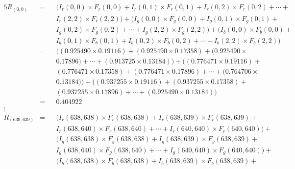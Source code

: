     \begin{alignat*}{5}
        R_{(0, 0)}          &=  &&\bigl( I_{r}(0, 0)\times F_{r}(0, 0) + I_{r}(0, 1)\times F_{r}(0, 1) + I_{r}(0, 2)\times F_{r}(0, 2) + \cdots + \\
                            &   &&I_{r}(2, 2)\times F_{r}(2, 2) \bigr) + \bigl( I_{g}(0, 0)\times F_{g}(0, 0) + I_{g}(0, 1)\times F_{g}(0, 1) + \\
                            &   &&I_{g}(0, 2)\times F_{g}(0, 2) + \cdots + I_{g}(2, 2)\times F_{g}(2, 2) \bigr) + \bigl( I_{b}(0, 0)\times F_{b}(0, 0) + \\
                            &   &&I_{b}(0, 1)\times F_{b}(0, 1) + I_{b}(0, 2)\times F_{b}(0, 2) + \cdots + I_{b}(2, 2)\times F_{b}(2, 2) \bigr) \\
                            &=  &&\bigl( (0.925490\times 0.19116) + (0.925490\times 0.17358) + (0.925490\times \\
                            &   &&0.17896) + \cdots + (0.913725\times 0.13184) \bigr) + \bigl( (0.776471\times 0.19116) + \\
                            &   &&(0.776471\times 0.17358) + (0.776471\times 0.17896) + \cdots + (0.764706\times \\
                            &   &&0.13184) \bigr) + \bigl( (0.937255\times 0.19116) + (0.937255\times 0.17358) + \\
                            &   &&(0.937255\times 0.17896) + \cdots + (0.925490\times 0.13184) \bigr) \\
                            &=  &&0.404922 \\
        \vdots \\
        R_{(639, 639)}      &=  &&\bigl( I_{r}(638, 638)\times F_{r}(638, 638) + I_{r}(638, 639)\times F_{r}(638, 639) + \\
                            &   &&I_{r}(638, 640)\times F_{r}(638, 640) + \cdots + I_{r}(640, 640)\times F_{r}(640, 640) \bigr) + \\
                            &   &&\bigl( I_{g}(638, 638)\times F_{g}(638, 638) + I_{g}(638, 639)\times F_{g}(638, 639) + \\
                            &   &&I_{g}(638, 640)\times F_{g}(638, 640) + \cdots + I_{g}(640, 640)\times F_{g}(640, 640) \bigr) + \\
                            &   &&\bigl( I_{b}(638, 638)\times F_{b}(638, 638) + I_{b}(638, 639)\times F_{b}(638, 639) + \\

\end{alignat*}
